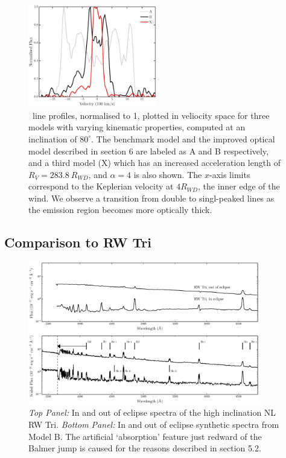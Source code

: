 \documentclass[preprint, a4paper, 11pt]{aastex}
\begin{document}
\begin{figure}
\includegraphics[width=0.5\textwidth]{figures/mc.eps}
\caption{
\ha\ line profiles, normalised to 1, plotted in veliocity space 
for three models with varying kinematic 
properties, computed at an inclination of $80^\circ$.
The benchmark model and the improved optical
model described in section 6 are labeled as A and B respectively,
and a third model (X) which has an increased acceleration length of 
$R_V = 283.8~R_{WD}$, and $\alpha=4$ is also shown. 
The $x$-axis limits correspond to the Keplerian velocity at 
$4R_{WD}$, the inner edge of the wind.
We observe a transition from double to singl-peaked lines
as the emission region becomes more optically thick.
}
\label{halpha}
\end{figure} %


\subsection{Comparison to RW Tri}

\begin{figure} %
\includegraphics[width=0.9\textwidth]{figures/fig13_eclipse.eps}
\caption{{\sl Top Panel:} In and out of eclipse spectra of the high
inclination NL RW Tri. {\sl Bottom Panel:} In and out of eclipse synthetic
spectra from Model B.
The artificial `absorption' feature just redward of the Balmer jump
is caused for the reasons described in section 5.2.}
\label{rwtricomp}
\end{figure} %
\end{document}
